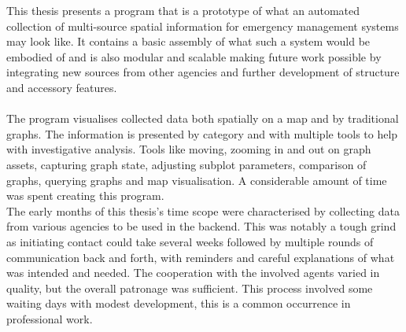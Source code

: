This thesis presents a program that is a prototype of what an automated collection of multi-source spatial information for emergency management systems may look like. It contains a basic assembly of what such a system would be embodied of and is also modular and scalable making future work possible by integrating new sources from other agencies and further development of structure and accessory features.
\\
\\
The program visualises collected data both spatially on a map and by traditional graphs. The information is presented by category and with multiple tools to help with investigative analysis. Tools like moving, zooming in and out on graph assets, capturing graph state, adjusting subplot parameters, comparison of graphs, querying graphs and map visualisation. A considerable amount of time was spent creating this program.
\\
The early months of this thesis's time scope were characterised by collecting data from various agencies to be used in the backend. This was notably a tough grind as initiating contact could take several weeks followed by multiple rounds of communication back and forth, with reminders and careful explanations of what was intended and needed. The cooperation with the involved agents varied in quality, but the overall patronage was sufficient. This process involved some waiting days with modest development, this is a common occurrence in professional work.
\\



